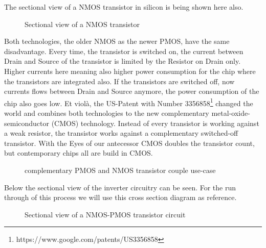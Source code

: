The sectional view of a NMOS transistor in silicon is being shown here also.
\begin{figure}[H]
	\centering
	\begin{tikzpicture}[node distance = 3cm, auto, thick,scale=0.5, every node/.style={transform shape}]
		
	\end{tikzpicture}
	\caption{Sectional view of a NMOS transistor}
\end{figure}

Both technologies, the older NMOS as the newer PMOS, have the same disadvantage. Every time, the transistor is switched on, the current between Drain and Source of the transistor is limited by the Resistor on Drain only. Higher currents here meaning also higher power consumption for the chip where the transistors are integrated also. If the transistors are switched off, now currents flows between Drain and Source anymore, the power consumption of the chip also goes low.
Et violà, the US-Patent with Number 3356858\footnote{https://www.google.com/patents/US3356858} changed the world and combines both technologies to the new complementary metal-oxide-semiconductor (CMOS) technology. Instead of every transistor is working against a weak resistor, the transistor works against a complementary switched-off transistor. With the Eyes of our antecessor CMOS doubles the transistor count, but contemporary chips all are build in CMOS.

\begin{figure}[H]
	\centering
	\begin{circuitdiagram}{20}{20}
	\end{circuitdiagram}
	\caption{complementary PMOS and NMOS transistor couple use-case}
\end{figure}

Below the sectional view of the inverter circuitry can be seen.
For the run through of this process we will use this cross section diagram as reference.
\begin{figure}[H]
	\centering
	\begin{tikzpicture}[node distance = 3cm, auto, thick,scale=0.5, every node/.style={transform shape}]
		
	\end{tikzpicture}
	\caption{Sectional view of a NMOS-PMOS transistor circuit}
\end{figure}
